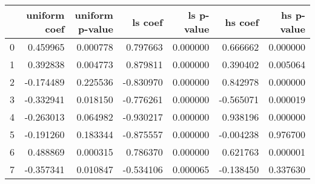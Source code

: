 \begin{tabular}{lrrrrrr}
\toprule
 & uniform coef & uniform p-value & ls coef & ls p-value & hs coef & hs p-value \\
\midrule
0 & 0.459965 & 0.000778 & 0.797663 & 0.000000 & 0.666662 & 0.000000 \\
1 & 0.392838 & 0.004773 & 0.879811 & 0.000000 & 0.390402 & 0.005064 \\
2 & -0.174489 & 0.225536 & -0.830970 & 0.000000 & 0.842978 & 0.000000 \\
3 & -0.332941 & 0.018150 & -0.776261 & 0.000000 & -0.565071 & 0.000019 \\
4 & -0.263013 & 0.064982 & -0.930217 & 0.000000 & 0.938196 & 0.000000 \\
5 & -0.191260 & 0.183344 & -0.875557 & 0.000000 & -0.004238 & 0.976700 \\
6 & 0.488869 & 0.000315 & 0.786370 & 0.000000 & 0.621763 & 0.000001 \\
7 & -0.357341 & 0.010847 & -0.534106 & 0.000065 & -0.138450 & 0.337630 \\
\bottomrule
\end{tabular}
